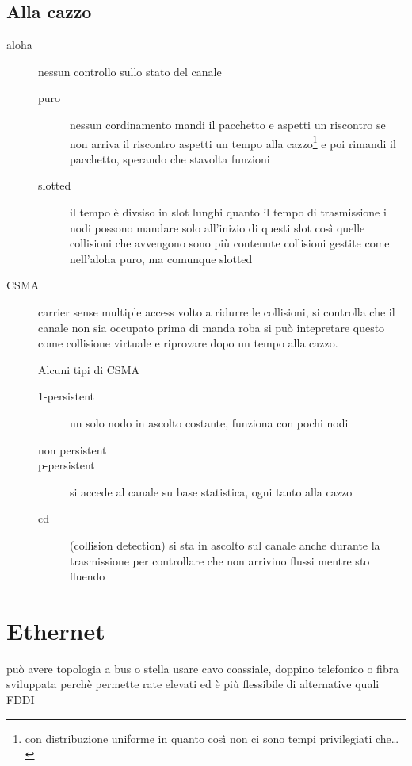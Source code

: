 \documentclass[11pt]{article}
\begin{document}
\subsection{Alla cazzo}
\label{sec:org1860b7d}
\begin{description}
\item[{aloha}] nessun controllo sullo stato del canale
\begin{description}
\item[{puro}] nessun cordinamento
mandi il pacchetto e aspetti un riscontro
se non arriva il riscontro aspetti un tempo alla cazzo\footnote{con distribuzione uniforme in quanto così non ci sono tempi privilegiati che\ldots{}} e poi rimandi il pacchetto, sperando che stavolta funzioni
\item[{slotted}] il tempo è divsiso in slot lunghi quanto il tempo di trasmissione
i nodi possono mandare solo all'inizio di questi slot
così quelle collisioni che avvengono sono più contenute
collisioni gestite come nell'aloha puro, ma comunque slotted
\end{description}
\item[{CSMA}] carrier sense multiple access volto a ridurre le collisioni, si controlla che il canale non sia occupato prima di manda roba
si può intepretare questo come collisione virtuale e riprovare dopo un tempo alla cazzo.

Alcuni tipi di CSMA
\begin{description}
\item[{1-persistent}] un solo nodo in ascolto costante, funziona con pochi nodi
\item[{non persistent}] 

\item[{p-persistent}] si accede al canale su base statistica, ogni tanto alla cazzo
\item[{cd}] (collision detection) si sta in ascolto sul canale anche durante la trasmissione per controllare che non arrivino flussi mentre sto fluendo
\end{description}
\end{description}

\section{Ethernet}
\label{sec:orgd2f02e6}
può avere topologia a bus o stella
usare cavo coassiale, doppino telefonico o fibra
sviluppata perchè permette rate elevati ed è più flessibile di alternative quali FDDI
\end{document}
